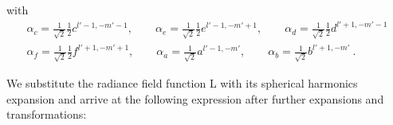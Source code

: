 \documentclass{egpubl}
\begin{document}
with
\begin{align*}
\alpha_c = \frac{1}{\sqrt{2}}\frac{1}{2}c^{{l'-1,-m'-1}}
,\qquad
\alpha_e = \frac{1}{\sqrt{2}}\frac{1}{2}e^{{l'-1,-m'+1}}
,\qquad
\alpha_d = \frac{1}{\sqrt{2}}\frac{1}{2}d^{{l'+1,-m'-1}}
\\
\alpha_f = \frac{1}{\sqrt{2}}\frac{1}{2}f^{{l'+1,-m'+1}}
,\qquad
\alpha_a = \frac{1}{\sqrt{2}}a^{{l'-1,-m'}}
,\qquad
\alpha_b = \frac{1}{\sqrt{2}}b^{{l'+1,-m'}}  \ .
\end{align*}

We substitute the radiance field function L with its spherical harmonics expansion and arrive
at the following expression after further expansions and transformations:
\end{document}
